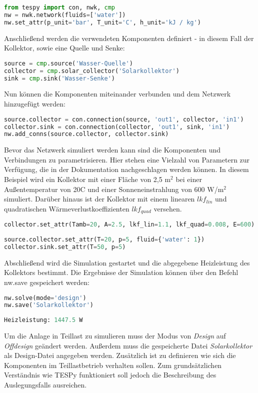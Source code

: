 \begin{lstlisting}[language=python,numbers=none]
from tespy import con, nwk, cmp	
nw = nwk.network(fluids=['water'])
nw.set_attr(p_unit='bar', T_unit='C', h_unit='kJ / kg')
\end{lstlisting}
Anschließend werden die verwendeten Komponenten definiert - in diesem Fall der Kollektor, sowie eine Quelle und Senke:
\begin{lstlisting}[language=python,numbers=none]
source = cmp.source('Wasser-Quelle')
collector = cmp.solar_collector('Solarkollektor')
sink = cmp.sink('Wasser-Senke')
\end{lstlisting}
Nun können die Komponenten miteinander verbunden und dem Netzwerk hinzugefügt werden:
\begin{lstlisting}[language=python,numbers=none]
source.collector = con.connection(source, 'out1', collector, 'in1')
collector.sink = con.connection(collector, 'out1', sink, 'in1')
nw.add_conns(source.collector, collector.sink)
\end{lstlisting} 
Bevor das Netzwerk simuliert werden kann sind die Komponenten und Verbindungen zu parametrisieren. Hier stehen eine Vielzahl von Parametern zur Verfügung, die in der Dokumentation \cite{TESPy2019} nachgeschlagen werden können. In diesem Beispiel wird ein Kollektor mit einer Fläche von 2,5 $\text{m}^2$ bei einer Außentemperatur von 20\textdegree C und einer Sonneneinstrahlung von 600 W/m$^2$ simuliert. Darüber hinaus ist der Kollektor mit einem linearen $lkf_{lin}$ und quadratischen Wärmeverlustkoeffizienten $lkf_{quad}$ versehen.
\begin{lstlisting}[language=python,numbers=none]
collector.set_attr(Tamb=20, A=2.5, lkf_lin=1.1, lkf_quad=0.008, E=600)
	
source.collector.set_attr(T=20, p=5, fluid={'water': 1})
collector.sink.set_attr(T=50, p=5)
\end{lstlisting}
Abschließend wird die Simulation gestartet und die abgegebene Heizleistung des Kollektors bestimmt. Die Ergebnisse der Simulation können über den Befehl nw.save gespeichert werden:
\begin{lstlisting}[language=python,numbers=none]
nw.solve(mode='design')
nw.save('Solarkollektor')
		
Heizleistung: 1447.5 W
\end{lstlisting}
Um die Anlage in Teillast zu simulieren muss der Modus von \textit{Design} auf \textit{Offdesign} geändert werden. Außerdem muss die gespeicherte Datei \textit{Solarkollektor} als Design-Datei angegeben werden. Zusätzlich ist zu definieren wie sich die Komponenten im Teillastbetrieb verhalten sollen. Zum grundsätzlichen Verständnis wie \ac{TESPy} funktioniert soll jedoch die Beschreibung des Auslegungsfalls ausreichen.
 

